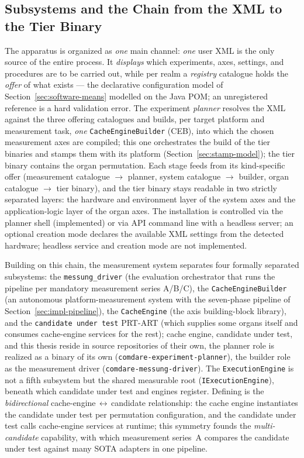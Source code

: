\begin{nurkurz}
\subsection{Subsystems and the Chain from the XML to the Tier Binary}\label{sec:mess-chain}
The apparatus is organized as \emph{one} main channel: \emph{one} user XML is the only source of the
entire process. It \emph{displays} which experiments, axes, settings, and procedures are to be carried
out, while per realm a \emph{registry} catalogue holds the \emph{offer} of what exists --- the
declarative configuration model of Section~\ref{sec:software-means} modelled on the Java POM\@; an
unregistered reference is a hard validation error. The experiment \emph{planner} resolves the XML
against the three offering catalogues and builds, per target platform and measurement task, \emph{one}
\texttt{CacheEngineBuilder} (CEB), into which the chosen measurement axes are compiled; this one
orchestrates the build of the tier binaries and stamps them with its platform
(Section~\ref{sec:stamp-model}); the tier binary contains the organ permutation. Each stage feeds from
its kind-specific offer (measurement catalogue $\to$ planner, system catalogue $\to$ builder, organ
catalogue $\to$ tier binary), and the tier binary stays readable in two strictly separated layers: the
hardware and environment layer of the system axes and the application-logic layer of the organ axes.
The installation is controlled via the planner shell (implemented) or via API command line with a
headless server; an optional creation mode declares the available XML settings from the detected
hardware; headless service and creation mode are not implemented.

Building on this chain, the measurement system separates four formally separated subsystems: the
\texttt{messung\_driver} (the evaluation orchestrator that runs the pipeline per mandatory measurement
series A/B/C), the \texttt{CacheEngineBuilder} (an autonomous platform-measurement system with the
seven-phase pipeline of Section~\ref{sec:impl-pipeline}), the \texttt{CacheEngine} (the axis
building-block library), and the \texttt{candidate under test} PRT-ART (which supplies some organs
itself and consumes cache-engine services for the rest); cache engine, candidate under test, and this
thesis reside in source repositories of their own, the planner role is realized as a binary of its own
(\texttt{comdare-experiment-planner}), the builder role as the measurement driver
(\texttt{comdare-messung-driver}). The \texttt{ExecutionEngine} is not a fifth subsystem but the shared
measurable root (\texttt{IExecutionEngine}), beneath which candidate under test and engines register.
Defining is the \emph{bidirectional} cache-engine\,$\leftrightarrow$\,candidate relationship: the cache
engine instantiates the candidate under test per permutation configuration, and the candidate under
test calls cache-engine services at runtime; this symmetry founds the \emph{multi-candidate}
capability, with which measurement series~A compares the candidate under test against many SOTA
adapters in one pipeline.


\end{nurkurz}
